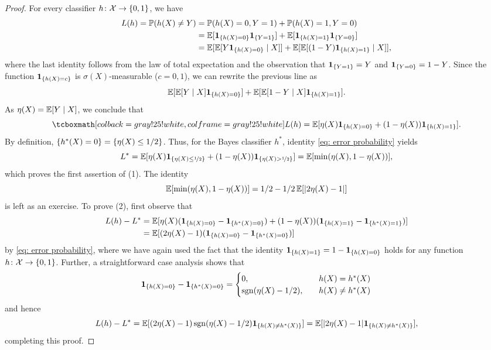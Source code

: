 \begin{proof}
For every classifier $h \colon \mathcal{X} \to \set{0, 1}$, we have
\begin{align*}
    L(h) = \P(h(X) \neq Y) &= \P(h(X) = 0, Y = 1) + \P(h(X) = 1, Y = 0) \\
    &= \Exp[\indSet{h(X) = 0} \indSet{Y = 1}] + \Exp[\indSet{h(X) = 1} \indSet{Y = 0}] \\
    &= \Exp[\Exp[Y \indSet{h(X) = 0} \given X]] + \Exp[\Exp[(1 - Y) \indSet{h(X) = 1} \given X]],
\end{align*}
where the last identity follows from the law of total expectation and the observation that $\indSet{Y = 1} = Y$ and $\indSet{Y = 0} = 1 - Y$. Since the function $\indSet{h(X) = c}$ is $\sigma(X)$-measurable ($c = 0, 1$), we can rewrite the previous line as
\[
    \Exp[\Exp[Y \given X] \indSet{h(X) = 0}] + \Exp[\Exp[1 - Y \given X] \indSet{h(X) = 1}].
\]
As $\eta(X) = \operatorname{\mathbb{E}}[Y \mathrel{|} X]$, we conclude that
\begin{equation}
    \label{eq: error probability}
    \highlightMath{
        L(h) = \Exp[\eta(X) \indSet{h(X) = 0} + (1 - \eta(X)) \indSet{h(X) = 1}].
    }
\end{equation}
By definition, $\set{h^*(X) = 0} = \set{\eta(X) \leq 1/2}$. Thus, for the Bayes classifier $h^*$, identity \eqref{eq: error probability} yields
\[
    L^* = \Exp[\eta(X) \indSet{\eta(X) \leq \nicefrac{1}{2}} + (1 - \eta(X)) \indSet{\eta(X) > \nicefrac{1}{2}}] = \Exp[\min(\eta(X), 1 - \eta(X))],
\]
which proves the first assertion of (1). The identity
\[
    \operatorname{\mathbb{E}}[\min(\eta(X), 1 - \eta(X))] = 1/2 - 1/2 \operatorname{\mathbb{E}}[\abs{2\eta(X) - 1 }]
\]
is left as an exercise. To prove (2), first observe that
\begin{align*}
    L(h) - L^* &= \Exp[\eta(X) (\indSet{h(X) = 0} - \indSet{h^*(X) = 0}) + (1 - \eta(X)) (\indSet{h(X) = 1} - \indSet{h^*(X) = 1})] \\
    &= \Exp[(2\eta(X) - 1) (\indSet{h(X) = 0} - \indSet{h^*(X) = 0})]
\end{align*}
by \eqref{eq: error probability}, where we have again used the fact that the identity $\indSet{h(X) = 1} = 1 - \indSet{h(X) = 0}$ holds for any function $h \colon \mathcal{X} \to \set{0, 1}$. Further, a straightforward case analysis shows that
\[
    \indSet{h(X) = 0} - \indSet{h^*(X) = 0} = \begin{cases}
        0, \quad & h(X) = h^*(X) \\
        \sgn(\eta(X) - 1/2), \quad & h(X) \neq h^*(X)
    \end{cases}
\]
and hence
\[
    L(h) - L^* = \Exp[(2\eta(X) - 1) \sgn(\eta(X) - 1/2) \indSet{h(X) \neq h^*(X)}] = \Exp[\abs{2\eta(X) - 1} \indSet{h(X) \neq h^*(X)}],
\]
completing this proof.
\end{proof}

